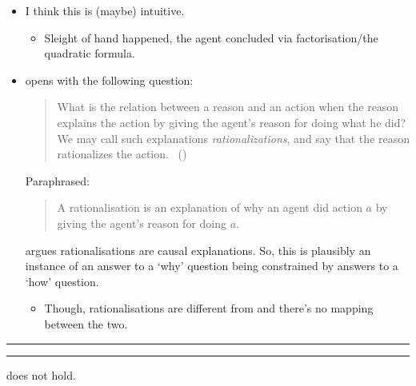 \documentclass[10pt]{article}
\newcommand\sepLine{
  \vfill
  \par\noindent\rule{\textwidth}{0.4pt}%
  \vspace{-10pt}%
  \par\noindent\rule{\textwidth}{0.4pt}
  \vfill}
\begin{document}
\begin{note}
  \begin{itemize}
  \item
    I think this is (maybe) intuitive.
    \begin{itemize}
    \item
      Sleight of hand happened, the agent concluded via factorisation/the quadratic formula.
    \end{itemize}
  \item
    \citeauthor{Davidson:1963aa} opens  with the following question:

    \begin{quote}
      What is the relation between a reason and an action when the reason explains the action by giving the agent's reason for doing what he did?
      We may call such explanations \emph{rationalizations}, and say that the reason rationalizes the action.%
      \mbox{ }\hfill\mbox{(\citeyear[685]{Davidson:1963aa})}
    \end{quote}

    Paraphrased:
    \begin{quote}
      A rationalisation is an explanation of why an agent did action \(a\) by giving the agent's reason for doing \(a\).
    \end{quote}
    \citeauthor{Davidson:1963aa} argues rationalisations are causal explanations.
    So, this is plausibly an instance of an answer to a `why' question being constrained by answers to a `how' question.
    \begin{itemize}
    \item
      Though, rationalisations are different from  and there's no mapping between the two.
    \end{itemize}
  \end{itemize}
\end{note}

\sepLine

\begin{note}
  \begin{thesis}
    \issueInclusion{} does not hold.
  \end{thesis}
\end{note}

\end{document}
